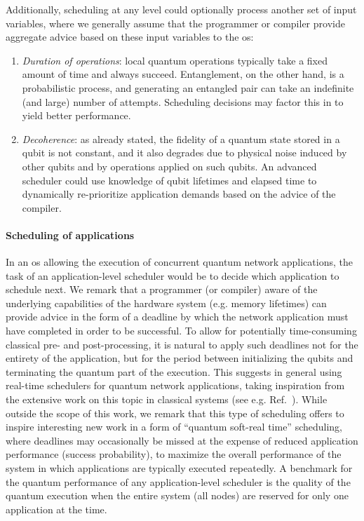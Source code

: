 Additionally, scheduling at any level could optionally process another set of input variables, where
we generally assume that the programmer or compiler provide aggregate advice based on these input
variables to the \acrshort{os}:

\begin{enumerate}
    \item \emph{Duration of operations}: local quantum operations typically take a fixed amount of
          time and always succeed. Entanglement, on the other hand, is a probabilistic process, and
          generating an entangled pair can take an indefinite (and large) number of attempts.
          Scheduling decisions may factor this in to yield better performance.
    \item \emph{Decoherence}: as already stated, the fidelity of a quantum state stored in a qubit
          is not constant, and it also degrades due to physical noise induced by other qubits and by
          operations applied on such qubits. An advanced scheduler could use knowledge of qubit
          lifetimes and elapsed time to dynamically re-prioritize application demands based on the
          advice of the compiler.
\end{enumerate}

\paragraph{Scheduling of applications}

In an \acrshort{os} allowing the execution of concurrent quantum network applications, the task of
an application-level scheduler would be to decide which application to schedule next. We remark that
a programmer (or compiler) aware of the underlying capabilities of the hardware system (e.g. memory
lifetimes) can provide advice in the form of a deadline by which the network application must have
completed in order to be successful. To allow for potentially time-consuming classical pre- and
post-processing, it is natural to apply such deadlines not for the entirety of the application, but
for the period between initializing the qubits and terminating the quantum part of the execution.
This suggests in general using real-time schedulers for quantum network applications, taking
inspiration from the extensive work on this topic in classical systems (see e.g.
Ref.~\cite{liu_1973_scheduling}). While outside the scope of this work, we remark that this type of
scheduling offers to inspire interesting new work in a form of ``quantum soft-real time''
scheduling, where deadlines may occasionally be missed at the expense of reduced application
performance (success probability), to maximize the overall performance of the system in which
applications are typically executed repeatedly. A benchmark for the quantum performance of any
application-level scheduler is the quality of the quantum execution when the entire system (all
nodes) are reserved for only one application at the time.

